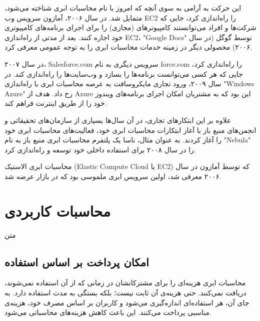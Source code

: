 \documentclass{book}
\begin{document}
            این حرکت به آرامی به سوی آنچه که امروز با نام محاسبات ابری شناخته می‌شود، متمایل شد. در سال ۲۰۰۶، آمازون سرویس وب EC2 را راه‌اندازی کرد، جایی که شرکت‌ها و افراد می‌توانستند کامپیوترهای (مجازی) را برای اجرای برنامه‌های کامپیوتری خود اجاره کنند. بعد از مدتی از راه‌اندازی EC2، "Google Docs" توسط گوگل (در سال ۲۰۰۶) محصولی دیگر در زمینه خدمات محاسبات ابری را به توجه عمومی معرفی کرد.

            در سال ۲۰۰۷، Salesforce.com سرویس دیگری به نام force.com را راه‌اندازی کرد، جایی که هر کسی می‌توانست برنامه‌ها را بسازد و وب‌سایت‌ها را راه‌اندازی کند. در سال ۲۰۰۹، ورود تجاری مایکروسافت به عرصه محاسبات ابری با راه‌اندازی "Windows Azure" رخ داد. هدف از Azure این بود که به مشتریان امکان اجرای برنامه‌های ویندوز خود را از طریق اینترنت فراهم کند.

            علاوه بر این ابتکارهای تجاری، در آن سال‌ها بسیاری از سازمان‌های تحقیقاتی و انجمن‌های منبع باز با آغاز ابتکارات محاسبات ابری خود، فعالیت‌های محاسبات ابری خود را آغاز کردند. به عنوان مثال، ناسا یک پلتفرم محاسبات ابری منبع باز به نام "Nebula" را در سال ۲۰۰۸ برای استفاده داخلی خود توسعه و راه‌اندازی کرد.

            \begin{addinfo}
                
                محاسبات ابری الاستیک (Elastic Compute Cloud یا EC2) که توسط آمازون در سال ۲۰۰۶ معرفی شد، اولین سرویس ابری ملموسی بود که در بازار عرضه شد.

            \end{addinfo}

        \section{محاسبات کاربردی}

            متن


    \subsection{امکان پرداخت بر اساس استفاده}
    محاسبات ابری هزینه‌ای را برای مشترکانشان در زمانی که از آن استفاده نمی‌شوند، دریافت نمی‌کنند. حتی هزینه‌ی آن ثابت نیست؛ بلکه بستگی به مدت استفاده دارد. به جای آن، هر استفاده‌ای اندازه‌گیری می‌شود و کاربران بر اساس مصرف خود، هزینه‌ی مناسبی پرداخت می‌کنند. این باعث کاهش هزینه‌های محاسباتی می‌شود.
\end{document}
